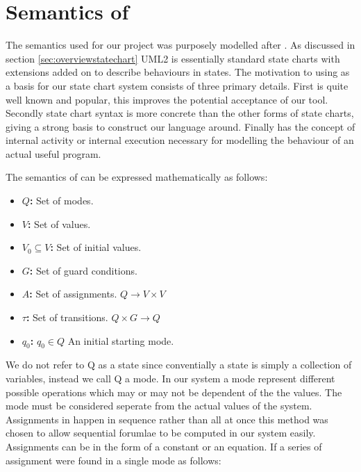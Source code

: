 \section{Semantics of \plcchart}
\label{sec:statechartsem}

The semantics used for our project was purposely modelled after \cite{UML2}. As discussed in section \ref{sec:overviewstatechart} UML2 is essentially standard state charts with extensions added on to describe behaviours in states. The motivation to using \cite{UML2} as a basis for our state chart system consists of three primary details. First \cite{UML2} is quite well known and popular, this improves the potential acceptance of our tool. Secondly \cite{UML2} state chart syntax is more concrete than the other forms of state charts, giving a strong basis to construct our language around. Finally \cite{UML2} has the concept of internal activity or internal execution necessary for modelling the behaviour of an actual useful program.

The semantics of \plcchart can be expressed mathematically as follows:

\begin{definition}
	\plcchart
	
\begin{itemize}
	\item \textbf{$Q$:} Set of modes.
	\item \textbf{$V$:} Set of values.
	\item \textbf{$V_0 \subseteq V$:} Set of initial values.
	\item \textbf{$G$:} Set of guard conditions.
	\item \textbf{$A$:} Set of assignments. $Q \rightarrow V \times V$
	\item \textbf{$\tau$:} Set of transitions. $Q \times G \rightarrow Q$
	\item \textbf{$q_0$:} $q_0 \in Q$ An initial starting mode.
\end{itemize}
\end{definition}

We do not refer to Q as a state since conventially a state is simply a collection of variables, instead we call Q a mode. In our system a mode represent different possible operations which may or may not be dependent of the the values. The mode must be considered seperate from the actual values of the system. Assignments in \plccharts happen in sequence rather than all at once this method was chosen to allow sequential forumlae to be computed in our system easily. Assignments can be in the form of a constant or an equation. If a series of assignment were found in a single mode as follows:

